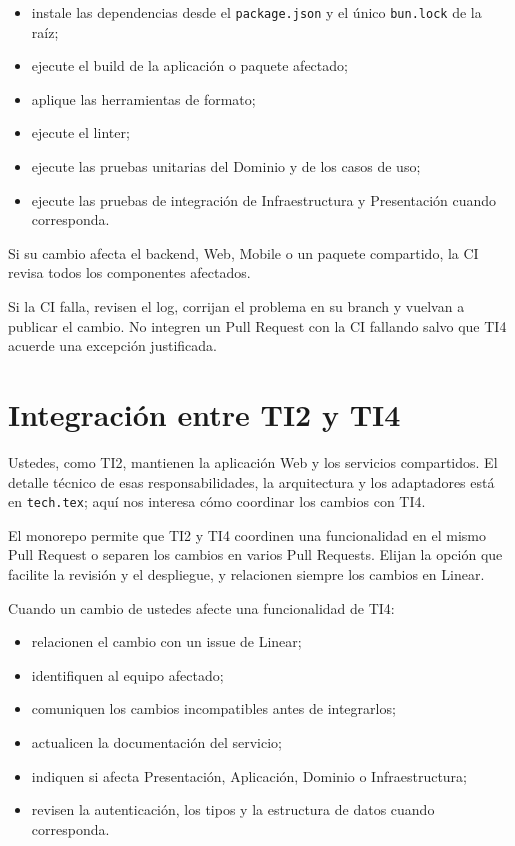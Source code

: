 \documentclass[11pt,a4paper]{article}
\begin{document}
\begin{itemize}
  \item instale las dependencias desde el \texttt{package.json} y el único
    \texttt{bun.lock} de la raíz;
  \item ejecute el build de la aplicación o paquete afectado;
  \item aplique las herramientas de formato;
  \item ejecute el linter;
  \item ejecute las pruebas unitarias del Dominio y de los casos de uso;
  \item ejecute las pruebas de integración de Infraestructura y Presentación
    cuando corresponda.
\end{itemize}

Si su cambio afecta el backend, Web, Mobile o un paquete compartido, la CI
revisa todos los componentes afectados.

Si la CI falla, revisen el log, corrijan el problema en su branch y vuelvan a
publicar el cambio. No integren un Pull Request con la CI fallando salvo que TI4
acuerde una excepción justificada.


\section{Integración entre TI2 y TI4}

Ustedes, como TI2, mantienen la aplicación Web y los servicios compartidos. El
detalle técnico de esas responsabilidades, la arquitectura y los adaptadores
está en \texttt{tech.tex}; aquí nos interesa cómo coordinar los cambios con TI4.

El monorepo permite que TI2 y TI4 coordinen una funcionalidad en el mismo Pull
Request o separen los cambios en varios Pull Requests. Elijan la opción que
facilite la revisión y el despliegue, y relacionen siempre los cambios en
Linear.

Cuando un cambio de ustedes afecte una funcionalidad de TI4:

\begin{itemize}
  \item relacionen el cambio con un issue de Linear;
  \item identifiquen al equipo afectado;
  \item comuniquen los cambios incompatibles antes de integrarlos;
  \item actualicen la documentación del servicio;
  \item indiquen si afecta Presentación, Aplicación, Dominio o Infraestructura;
  \item revisen la autenticación, los tipos y la estructura de datos cuando
    corresponda.
\end{itemize}
\end{document}
